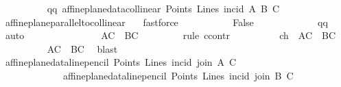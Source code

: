 \begin{isabellebody}
\ \ \ \ \ \ \ \ \isamarkupfalse%
\ qq{\isacharcolon}{\kern0pt}\ {\isachardoublequoteopen}affine{\isacharunderscore}{\kern0pt}plane{\isacharunderscore}{\kern0pt}data{\isachardot}{\kern0pt}collinear\ Points\ Lines\ {\isacharparenleft}{\kern0pt}incid{\isacharparenright}{\kern0pt}\ A\ B\ C{\isachardoublequoteclose}\ \isamarkupfalse%
\ affine{\isacharunderscore}{\kern0pt}plane{\isachardot}{\kern0pt}parallel{\isacharunderscore}{\kern0pt}to{\isacharunderscore}{\kern0pt}collinear\ {}\ \isamarkupfalse%
\ fastforce\ \isanewline
\ \ \ \ \ \ \ \ \isamarkupfalse%
\ {\isachardoublequoteopen}False{\isachardoublequoteclose}\isanewline
\ \ \ \ \ \ \ \ \ \ \isamarkupfalse%
\ {\isachardoublequoteopen}{}{\isachardoublequoteclose}\ qq\ \isamarkupfalse%
\ auto\isanewline
\ \ \ \ \ \ \isamarkupfalse%
\isanewline
\ \ \ \ \ \ \isamarkupfalse%
\ {}{}{\isacharcolon}{\kern0pt}\ {\isachardoublequoteopen}{\isacharquery}{\kern0pt}AC\ {\isasymnoteq}\ {\isacharquery}{\kern0pt}BC{\isachardoublequoteclose}\ \isanewline
\ \ \ \ \ \ \isamarkupfalse%
\ {\isacharparenleft}{\kern0pt}rule\ ccontr{\isacharparenright}{\kern0pt}\isanewline
\ \ \ \ \ \ \ \ \isamarkupfalse%
\ ch{\isacharcolon}{\kern0pt}\ {\isachardoublequoteopen}{\isasymnot}\ {\isacharparenleft}{\kern0pt}{\isacharquery}{\kern0pt}AC\ {\isasymnoteq}\ {\isacharquery}{\kern0pt}BC{\isacharparenright}{\kern0pt}{\isachardoublequoteclose}\isanewline
\ \ \ \ \ \ \ \ \isamarkupfalse%
\ {\isachardoublequoteopen}{\isacharquery}{\kern0pt}AC\ {\isacharequal}{\kern0pt}\ {\isacharquery}{\kern0pt}BC{\isachardoublequoteclose}\ \isamarkupfalse%
\ blast\isanewline
\ \ \ \ \ \ \ \ \isamarkupfalse%
\ {\isachardoublequoteopen}{\isacharparenleft}{\kern0pt}affine{\isacharunderscore}{\kern0pt}plane{\isacharunderscore}{\kern0pt}data{\isachardot}{\kern0pt}line{\isacharunderscore}{\kern0pt}pencil\ Points\ Lines\ {\isacharparenleft}{\kern0pt}incid{\isacharparenright}{\kern0pt}\ {\isacharparenleft}{\kern0pt}join\ A\ C{\isacharparenright}{\kern0pt}{\isacharparenright}{\kern0pt}\ {\isacharequal}{\kern0pt}\isanewline
\ \ \ \ \ \ \ \ \ \ \ \ \ {\isacharparenleft}{\kern0pt}affine{\isacharunderscore}{\kern0pt}plane{\isacharunderscore}{\kern0pt}data{\isachardot}{\kern0pt}line{\isacharunderscore}{\kern0pt}pencil\ Points\ Lines\ {\isacharparenleft}{\kern0pt}incid{\isacharparenright}{\kern0pt}\ {\isacharparenleft}{\kern0pt}join\ B\ C{\isacharparenright}{\kern0pt}{\isacharparenright}{\kern0pt}{\isachardoublequoteclose}\ \isamarkupfalse%

\end{isabellebody}
